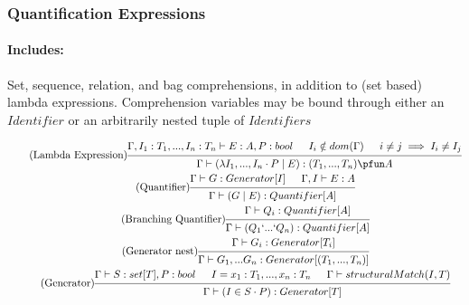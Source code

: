 \documentclass{article}
\begin{document}
\subsubsection{Quantification Expressions}
\paragraph{Includes:} Set, sequence, relation, and bag comprehensions, in addition to (set based) lambda expressions. Comprehension variables may be bound through either an $Identifier$ or an arbitrarily nested tuple of $Identifiers$

\begin{gather}
\tag{Lambda Expression}
\begin{prooftree}
\hypo{\Gamma, I_1:T_1, ..., I_n: T_n \vdash E:A, P: bool}
\hypo{I_i \notin dom(\Gamma)}
\hypo{i \neq j \implies I_i \neq I_j}
\infer3{\Gamma \vdash (\lambda I_1, ..., I_n \cdot P \mid E): (T_1, ..., T_n) \pfun A}
\end{prooftree}
\\
\tag{Quantifier}
\begin{prooftree}
\hypo{\Gamma \vdash G: Generator[I]}
\hypo{\Gamma , I \vdash E: A}
\infer2{\Gamma \vdash (G \mid E) : Quantifier[A]}
\end{prooftree}
\\
\tag{Branching Quantifier}
\begin{prooftree}
\hypo{\Gamma \vdash Q_i : Quantifier[A]}
\infer1{\Gamma \vdash (Q_1 ` ... ` Q_n): Quantifier[A]}
\end{prooftree}
\\
\tag{Generator nest}
\begin{prooftree}
\hypo{\Gamma \vdash G_i: Generator[T_i]}
\infer1{\Gamma \vdash G_1, ... G_n : Generator[(T_1,..., T_n)]} %
\end{prooftree}
\\
\tag{Generator}
\begin{prooftree}
\hypo{\Gamma \vdash S: set[T], P: bool}
\hypo{I = x_1:T_1, ..., x_n:T_n}
\hypo{\Gamma \vdash structuralMatch(I, T)}
\infer3{\Gamma \vdash (I \in S \cdot P): Generator[T]}
\end{prooftree}
\\

\end{gather}
\end{document}
